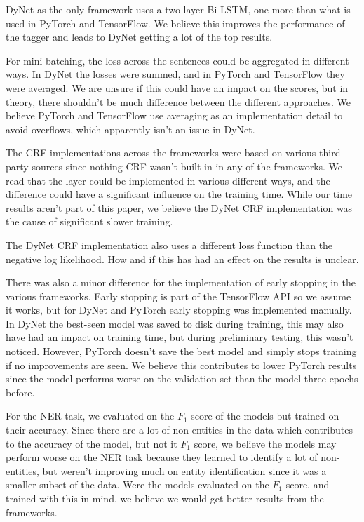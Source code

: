 DyNet as the only framework uses a two-layer Bi-LSTM, one more than what is used
in PyTorch and TensorFlow. We believe this improves the performance of the
tagger and leads to DyNet getting a lot of the top results. 

For mini-batching, the loss across the sentences could be aggregated in different
ways. In DyNet the losses were summed, and in PyTorch and TensorFlow they were
averaged. We are unsure if this could have an impact on the scores, but in
theory, there shouldn't be much difference between the different approaches. We
believe PyTorch and TensorFlow use averaging as an implementation detail to
avoid overflows, which apparently isn't an issue in DyNet.

The CRF implementations across the frameworks were based on various third-party
sources since nothing CRF wasn't built-in in any of the frameworks. We read that
the layer could be implemented in various different ways, and the difference
could have a significant influence on the training time. While our time results
aren't part of this paper, we believe the DyNet CRF implementation was the cause
of significant slower training. 

The DyNet CRF implementation also uses a different loss function than the
negative log likelihood. How and if this has had an effect on the results is
unclear.

There was also a minor difference for the implementation of early stopping in
the various frameworks. Early stopping is part of the TensorFlow API so we
assume it works, but for DyNet and PyTorch early stopping was implemented
manually. In DyNet the best-seen model was saved to disk during training, this
may also have had an impact on training time, but during preliminary testing,
this wasn't noticed. However, PyTorch doesn't save the best model and simply
stops training if no improvements are seen. We believe this contributes to lower
PyTorch results since the model performs worse on the validation set than the
model three epochs before. 

For the NER task, we evaluated on the $F_1$ score of the models but trained on
their accuracy. Since there are a lot of non-entities in the data which
contributes to the accuracy of the model, but not it $F_1$ score, we believe the
models may perform worse on the NER task because they learned to identify a lot
of non-entities, but weren't improving much on entity identification since it
was a smaller subset of the data. Were the models evaluated on the $F_1$ score,
and trained with this in mind, we believe we would get better results from the
frameworks. 

